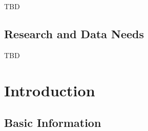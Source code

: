 \documentclass[11pt,
  english,
  a4paper,
]{article}
\begin{document}

TBD

\leavevmode\tagmcend\tagstructend\par


\hypertarget{research-and-data-needs}{%
\subsection*{Research and Data Needs}\label{research-and-data-needs}}

\leavevmode\tagmcend\tagstructend


TBD

\leavevmode\tagmcend\tagstructend\par

\pagebreak
\setlength{\parskip}{5mm plus1mm minus1mm}
\setcounter{page}{1}
\renewcommand{\thefigure}{\arabic{figure}}
\renewcommand{\thetable}{\arabic{table}}
\setcounter{table}{0}
\setcounter{figure}{0}

\setlength\parskip{0.5em plus 0.1em minus 0.2em}


\hypertarget{introduction}{%
\section{Introduction}\label{introduction}}

\leavevmode\tagmcend\tagstructend


\hypertarget{basic-information}{%
\subsection{Basic Information}\label{basic-information}}

\leavevmode\tagmcend\tagstructend

\end{document}
